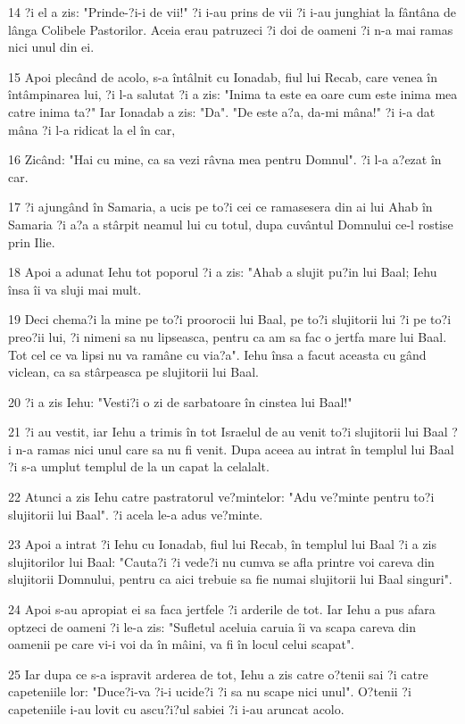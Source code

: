 \par 14 ?i el a zis: "Prinde-?i-i de vii!" ?i i-au prins de vii ?i i-au junghiat la fântâna de lânga Colibele Pastorilor. Aceia erau patruzeci ?i doi de oameni ?i n-a mai ramas nici unul din ei.
\par 15 Apoi plecând de acolo, s-a întâlnit cu Ionadab, fiul lui Recab, care venea în întâmpinarea lui, ?i l-a salutat ?i a zis: "Inima ta este ea oare cum este inima mea catre inima ta?" Iar Ionadab a zis: "Da". "De este a?a, da-mi mâna!" ?i i-a dat mâna ?i l-a ridicat la el în car,
\par 16 Zicând: "Hai cu mine, ca sa vezi râvna mea pentru Domnul". ?i l-a a?ezat în car.
\par 17 ?i ajungând în Samaria, a ucis pe to?i cei ce ramasesera din ai lui Ahab în Samaria ?i a?a a stârpit neamul lui cu totul, dupa cuvântul Domnului ce-l rostise prin Ilie.
\par 18 Apoi a adunat Iehu tot poporul ?i a zis: "Ahab a slujit pu?in lui Baal; Iehu însa îi va sluji mai mult.
\par 19 Deci chema?i la mine pe to?i proorocii lui Baal, pe to?i slujitorii lui ?i pe to?i preo?ii lui, ?i nimeni sa nu lipseasca, pentru ca am sa fac o jertfa mare lui Baal. Tot cel ce va lipsi nu va ramâne cu via?a". Iehu însa a facut aceasta cu gând viclean, ca sa stârpeasca pe slujitorii lui Baal.
\par 20 ?i a zis Iehu: "Vesti?i o zi de sarbatoare în cinstea lui Baal!"
\par 21 ?i au vestit, iar Iehu a trimis în tot Israelul de au venit to?i slujitorii lui Baal ?i n-a ramas nici unul care sa nu fi venit. Dupa aceea au intrat în templul lui Baal ?i s-a umplut templul de la un capat la celalalt.
\par 22 Atunci a zis Iehu catre pastratorul ve?mintelor: "Adu ve?minte pentru to?i slujitorii lui Baal". ?i acela le-a adus ve?minte.
\par 23 Apoi a intrat ?i Iehu cu Ionadab, fiul lui Recab, în templul lui Baal ?i a zis slujitorilor lui Baal: "Cauta?i ?i vede?i nu cumva se afla printre voi careva din slujitorii Domnului, pentru ca aici trebuie sa fie numai slujitorii lui Baal singuri".
\par 24 Apoi s-au apropiat ei sa faca jertfele ?i arderile de tot. Iar Iehu a pus afara optzeci de oameni ?i le-a zis: "Sufletul aceluia caruia îi va scapa careva din oamenii pe care vi-i voi da în mâini, va fi în locul celui scapat".
\par 25 Iar dupa ce s-a ispravit arderea de tot, Iehu a zis catre o?tenii sai ?i catre capeteniile lor: "Duce?i-va ?i-i ucide?i ?i sa nu scape nici unul". O?tenii ?i capeteniile i-au lovit cu ascu?i?ul sabiei ?i i-au aruncat acolo.
